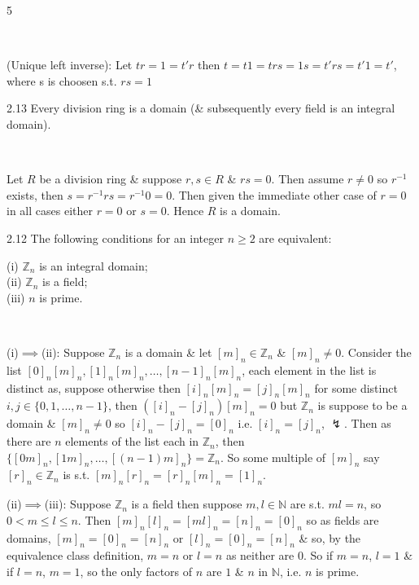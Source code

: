 \documentclass[8pt]{extarticle}
\makeatletter
\renewenvironment{proof}[1][\proofname]{%
  \pushQED{\qed}%
  \par\noindent\normalfont\itshape #1\@addpunct{.}\ \normalfont\ignorespaces
}{%
  \popQED%
  \par
}
\makeatother
\begin{document}
\begin{multicols*}{5}
\begin{proof}
            (Unique left inverse): Let \(tr=1=t'r\) then \(t=t1=trs=1s=t'rs=t'1=t'\), where s is choosen s.t. \(rs=1\)
        \end{proof}

        \begin{proposition}{2.13}
            Every division ring is a domain (\& subsequently every field is an integral domain).
        \end{proposition}

        \begin{proof}
            Let \(R\) be a division ring \& suppose \(r,s\in R\) \& \(rs=0\). Then assume \(r\ne0\) so \(r^{-1}\) exists, then \(s=r^{-1}rs=r^{-1}0=0\). Then given the immediate other case of \(r=0\) in all cases either \(r=0\) or \(s=0\). Hence \(R\) is a domain.
        \end{proof}

        \begin{lemma}{2.12}
            The following conditions for an integer \(n\ge2\) are equivalent:

            (i) \(\mathbb{Z}_n\) is an integral domain;\\
            (ii) \(\mathbb{Z}_n\) is a field;\\
            (iii) \(n\) is prime.
        \end{lemma}

        \begin{proof}
            (i)\(\implies\)(ii):
            Suppose \(\mathbb{Z}_n\) is a domain \& let \([m]_n\in\mathbb{Z}_n\) \& \([m]_n\ne0\). Consider the list \([0]_n[m]_n,[1]_n[m]_n,\ldots,[n-1]_n[m]_n\), each element in the list is distinct as, suppose otherwise then \([i]_n[m]_n=[j]_n[m]_n\) for some distinct \(i,j\in\{0,1,\ldots,n-1\}\), then \(([i]_n-[j]_n)[m]_n=0\) but \(\mathbb{Z}_n\) is suppose to be a domain \& \([m]_n\ne0\) so \([i]_n-[j]_n=[0]_n\) i.e. \([i]_n=[j]_n\), \(\lightning\). Then as there are \(n\) elements of the list each in \(\mathbb{Z}_n\), then \(\{[0m]_n,[1m]_n,\ldots,[(n-1)m]_n\}=\mathbb{Z}_n\). So some multiple of \([m]_n\) say \([r]_n\in\mathbb{Z}_n\) is s.t. \([m]_n[r]_n=[r]_n[m]_n=[1]_n\).

            (ii)\(\implies\)(iii):
            Suppose \(\mathbb{Z}_n\) is a field then suppose \(m,l\in\mathbb{N}\) are s.t. \(ml=n\), so \(0<m\le l\le n\). Then \([m]_n[l]_n=[ml]_n=[n]_n=[0]_n\) so as fields are domains, \([m]_n=[0]_n=[n]_n\) or \([l]_n=[0]_n=[n]_n\) \& so, by the equivalence class definition, \(m=n\) or \(l=n\) as neither are \(0\). So if \(m=n\), \(l=1\) \& if \(l=n\), \(m=1\), so the only factors of \(n\) are \(1\) \& \(n\) in \(\mathbb{N}\), i.e. \(n\) is prime.


\end{proof}
\end{multicols*}
\end{document}
